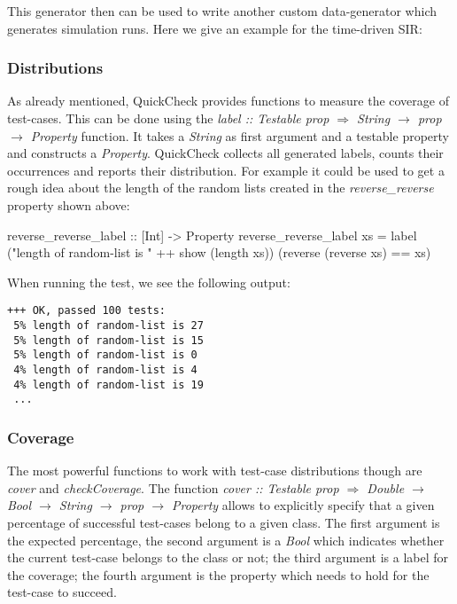 This generator then can be used to write another custom data-generator which generates simulation runs. Here we give an example for the time-driven SIR:


\subsubsection*{Distributions}
As already mentioned, QuickCheck provides functions to measure the coverage of test-cases. This can be done using the 
\textit{label :: Testable prop $\Rightarrow$ String $\rightarrow$ prop $\rightarrow$ Property} function. It takes a \textit{String} as first argument and a testable property and constructs a \textit{Property}. QuickCheck collects all generated labels, counts their occurrences and reports their distribution. For example it could be used to get a rough idea about the length of the random lists created in the \textit{reverse\_reverse} property shown above:

\begin{HaskellCode}
reverse_reverse_label :: [Int] -> Property
reverse_reverse_label xs  
  = label ("length of random-list is " ++ show (length xs)) 
          (reverse (reverse xs) == xs)
\end{HaskellCode}
When running the test, we see the following output:

\begin{verbatim}
+++ OK, passed 100 tests:
 5% length of random-list is 27
 5% length of random-list is 15
 5% length of random-list is 0
 4% length of random-list is 4
 4% length of random-list is 19
 ...
\end{verbatim}

\subsubsection*{Coverage}
The most powerful functions to work with test-case distributions though are \textit{cover} and \textit{checkCoverage}. The function \textit{cover :: Testable prop $\Rightarrow$ Double $\rightarrow$ Bool $\rightarrow$ String $\rightarrow$ prop $\rightarrow$ Property} allows to explicitly specify that a given percentage of successful test-cases belong to a given class. The first argument is the expected percentage, the second argument is a \textit{Bool} which indicates whether the current test-case belongs to the class or not; the third argument is a label for the coverage; the fourth argument is the property which needs to hold for the test-case to succeed. 


